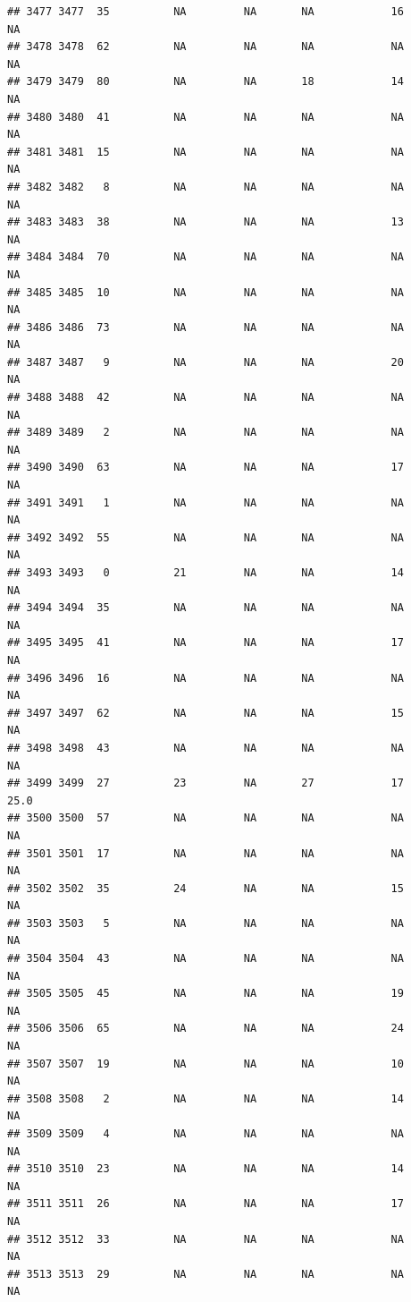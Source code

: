 \documentclass[man]{apa6}
\begin{document}
\begin{verbatim}
## 3477 3477  35          NA         NA       NA            16       NA
## 3478 3478  62          NA         NA       NA            NA       NA
## 3479 3479  80          NA         NA       18            14       NA
## 3480 3480  41          NA         NA       NA            NA       NA
## 3481 3481  15          NA         NA       NA            NA       NA
## 3482 3482   8          NA         NA       NA            NA       NA
## 3483 3483  38          NA         NA       NA            13       NA
## 3484 3484  70          NA         NA       NA            NA       NA
## 3485 3485  10          NA         NA       NA            NA       NA
## 3486 3486  73          NA         NA       NA            NA       NA
## 3487 3487   9          NA         NA       NA            20       NA
## 3488 3488  42          NA         NA       NA            NA       NA
## 3489 3489   2          NA         NA       NA            NA       NA
## 3490 3490  63          NA         NA       NA            17       NA
## 3491 3491   1          NA         NA       NA            NA       NA
## 3492 3492  55          NA         NA       NA            NA       NA
## 3493 3493   0          21         NA       NA            14       NA
## 3494 3494  35          NA         NA       NA            NA       NA
## 3495 3495  41          NA         NA       NA            17       NA
## 3496 3496  16          NA         NA       NA            NA       NA
## 3497 3497  62          NA         NA       NA            15       NA
## 3498 3498  43          NA         NA       NA            NA       NA
## 3499 3499  27          23         NA       27            17     25.0
## 3500 3500  57          NA         NA       NA            NA       NA
## 3501 3501  17          NA         NA       NA            NA       NA
## 3502 3502  35          24         NA       NA            15       NA
## 3503 3503   5          NA         NA       NA            NA       NA
## 3504 3504  43          NA         NA       NA            NA       NA
## 3505 3505  45          NA         NA       NA            19       NA
## 3506 3506  65          NA         NA       NA            24       NA
## 3507 3507  19          NA         NA       NA            10       NA
## 3508 3508   2          NA         NA       NA            14       NA
## 3509 3509   4          NA         NA       NA            NA       NA
## 3510 3510  23          NA         NA       NA            14       NA
## 3511 3511  26          NA         NA       NA            17       NA
## 3512 3512  33          NA         NA       NA            NA       NA
## 3513 3513  29          NA         NA       NA            NA       NA

\end{verbatim}
\end{document}
